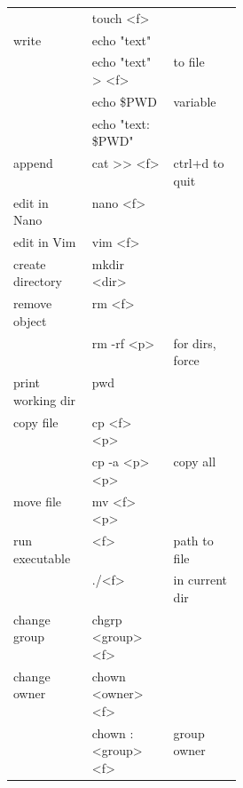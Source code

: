 {\begin{tabularx}{\linewidth}{@{} l>{\ttfamily}lp{0.3\linewidth} @{}}
                             & touch <f>                  &                                  \\
        write                & echo "text"                &                                  \\
                             & echo "text" > <f>          & to file                          \\
                             & echo \$PWD                 & variable                         \\
                             & echo "text: \$PWD"         &                                  \\
        append               & cat >> <f>                 & ctrl+d to quit                   \\
        edit in Nano         & nano <f>                   &                                  \\
        edit in Vim          & vim <f>                    &                                  \\
        create directory     & mkdir <dir>                &                                  \\
        remove object        & rm <f>                     &                                  \\
                             & rm -rf <p>                 & for dirs, force                  \\
        print working dir    & pwd                        &                                  \\
        copy file            & cp <f> <p>                 &                                  \\
                             & cp -a <p> <p>              & copy all                         \\
        move file            & mv <f> <p>                 &                                  \\
        run executable       & <f>                        & path to file                     \\
                             & ./<f>                      & in current dir                   \\
        change group         & chgrp <group> <f>          &                                  \\
        change owner         & chown <owner> <f>          &                                  \\
                             & chown :<group> <f>         & group owner                      \\

\end{tabularx}}

